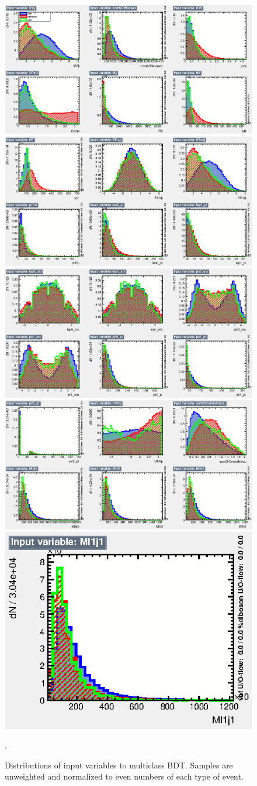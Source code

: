  
\begin{figure}[!htbp]
    \centering
    \includegraphics[width=0.27\linewidth]{Pictures/finalBDT_def/variables_id_c1.eps} \quad
    \includegraphics[width=0.27\linewidth]{Pictures/finalBDT_def/variables_id_c2.eps} \quad
    \includegraphics[width=0.27\linewidth]{Pictures/finalBDT_def/variables_id_c3.eps}
    \medskip
    \includegraphics[width=0.27\linewidth]{Pictures/finalBDT_def/variables_id_c4.eps} \quad
    \includegraphics[width=0.27\linewidth]{Pictures/finalBDT_def/variables_id_c5.eps}
    \caption{Distributions of input variables to multiclass BDT. Samples are unweighted and normalized to even numbers of each type of event.}.
    \label{fig:multiclassBDTinput}
\end{figure}
%
